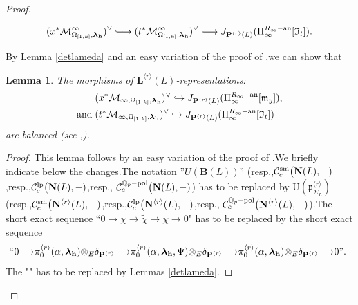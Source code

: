\documentclass[SecEq,CM,GP]{degruyter-crelle} %
\theoremstyle{plain}
\newtheorem{lem}[thm]{Lemma}
\newcommand{\hooklongrightarrow}{\lhook\joinrel\longrightarrow}
\newcommand{\ana}{{\rm an}}
\newcommand{\lrr}{{\langle r\rangle}}
\newcommand{\lp}{{\rm lp}}
\newcommand{\omepik}{\Omega_{[1,k]}}
\newcommand{\pol}{{\rm pol}}
\newcommand{\ra}{{\longrightarrow}}
\newcommand{\sm}{{\rm sm}}
\newcommand{\te}{{\otimes_E}}
\newcommand{\BQ}{{\mathbb{Q}}}
\newcommand{\bB}{{\mathbf{B}}}
\newcommand{\bL}{{\mathbf{L}}}
\newcommand{\bN}{{\mathbf{N}}}
\newcommand{\bP}{{\mathbf{P}}}
\newcommand{\bh}{{\mathbf{h}}}
\newcommand{\cC}{\mathcal C}
\newcommand{\cM}{\mathcal M}
\newcommand{\FI}{{\mathfrak{I}}}
\newcommand{\fm}{{\mathfrak{m}}}
\newcommand{\fp}{{\mathfrak{p}}}
\begin{document}
\begin{proof}
\begin{itemize}
	\begin{equation}\label{equ: lgln-injf}(x^*\cM^{\infty}_{\omepik,{\bm\lambda}_\bh})^{\vee}\hooklongrightarrow (t^* \cM^{\infty}_{\omepik,{\bm\lambda}_\bh})^{\vee} \hooklongrightarrow J_{\bP^{\lrr}(L)}(\Pi_{\infty}^{R_{\infty}-\ana}[\FI_t]).\end{equation}
\end{itemize}
By Lemma \ref{detlameda} and an easy variation of the proof of
\cite[Lemma 4.11]{2019DINGSimple},\;we can show that
\begin{lem} The morphisms of $\bL^{\lrr}(L)$-representations:
	\begin{equation}
		\begin{aligned}
			&(x^*\cM_{\infty,\omepik,{\bm\lambda}_\bh})^{\vee} \hookrightarrow J_{\bP^{\lrr}(L)}(\Pi_{\infty}^{R_{\infty}-\ana}[\fm_y]),\\
			\text{and\;}&(t^* \cM_{\infty,\omepik,{\bm\lambda}_\bh})^{\vee} \hookrightarrow
			J_{\bP^{\lrr}(L)}(\Pi_{\infty}^{R_{\infty}-\ana}[\FI_t])
		\end{aligned}
	\end{equation}
	are balanced (see \cite[Definition 0.8]{emerton2007jacquet},\;\cite[Definition 5.17]{Emerton2007summary}).
\end{lem}
\begin{proof}This lemma follows by an easy variation of the proof of \cite[Lemma 4.11]{2019DINGSimple}.\;We briefly indicate below the changes.\;The notation ''$U(\bB(L))$'' (resp.,\;$\cC^{\sm}_c\big(\bN(L),-)$,\;resp.,\;$\cC^{\lp}_c\big(\bN(L),-)$,\;resp., $\cC^{\BQ_p-\pol}_c\big(\bN(L),-)$) has to be replaced by $\text{U}(\fp^{\lrr}_{\Sigma_L})$ (resp.,\;$\cC^{\sm}_c\big(\bN^{\lrr}(L),-)$,\;resp.,$\cC^{\lp}_c\big(\bN^{\lrr}(L),-)$,\;resp., $\cC^{\BQ_p-\pol}_c\big(\bN^{\lrr}(L),-)$).\;The short exact sequence ``$0\rightarrow\chi\rightarrow\widetilde{\chi}\rightarrow\chi\rightarrow0$"  has to be replaced by the short exact sequence
	$$ ``0 \ra\pi_0^{\lrr}(\alpha,{\bm\lambda}_\bh)\te \delta_{\bP^{\lrr}}  \ra \pi_0^{\lrr}(\alpha,{\bm\lambda}_\bh,\Psi)\te \delta_{\bP^{\lrr}}\ra \pi_0^{\lrr}(\alpha,{\bm\lambda}_\bh)\te \delta_{\bP^{\lrr}} \ra 0".\;$$The "\cite[Lemma 4.6]{2019DINGSimple}" has to be replaced by Lemmas \ref{detlameda}.\;
\end{proof}


\end{proof}
\end{document}
